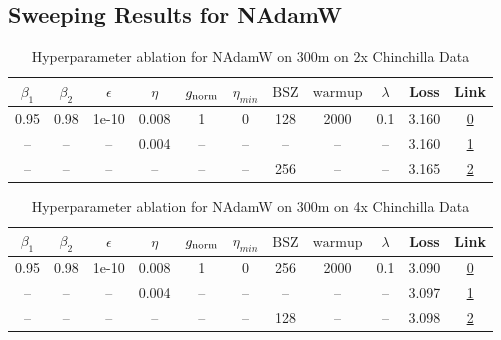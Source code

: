 \subsection{Sweeping Results for NAdamW}%
\begin{table}[H]
\centering
\caption{Hyperparameter ablation for NAdamW on 300m on 2x Chinchilla Data}
\label{tab:ablation_nadamw_300m_on_2x_chinchilla_data}
\begin{tabular}{ccccccccccc}
\toprule
$\beta_1$ & $\beta_2$ & $\epsilon$ & $\eta$ & $g_{\mathrm{norm}}$ & $\eta_{min}$ & $\mathrm{BSZ}$ & $\mathrm{warmup}$ & $\lambda$ & Loss & Link \\
\midrule
0.95 & 0.98 & 1e-10 & 0.008 & 1 & 0 & 128 & 2000 & 0.1 & 3.160 & \href{https://wandb.ai/marin-community/optimizer-scaling/runs/sweep-300m-12B-nadamwd89df2lr0.008-wd0.1-minlr0-warmup2000-b10.9-07cb43}{0} \\
\midrule
-- & -- & -- & 0.004 & -- & -- & -- & -- & -- & 3.160 & \href{https://wandb.ai/marin-community/optimizer-scaling/runs/sweep-300m-12B-nadamw59ffb0lr0.004-wd0.1-minlr0-warmup2000-b10.9-f2e4bd}{1} \\
-- & -- & -- & -- & -- & -- & 256 & -- & -- & 3.165 & \href{https://wandb.ai/marin-community/optimizer-scaling/runs/sweep-300m-12B-nadamwf15cf6lr0.008-wd0.1-minlr0-warmup2000-b10.9-3065ca}{2} \\
\bottomrule
\end{tabular}
\end{table}

\begin{table}[H]
\centering
\caption{Hyperparameter ablation for NAdamW on 300m on 4x Chinchilla Data}
\label{tab:ablation_nadamw_300m_on_4x_chinchilla_data}
\begin{tabular}{ccccccccccc}
\toprule
$\beta_1$ & $\beta_2$ & $\epsilon$ & $\eta$ & $g_{\mathrm{norm}}$ & $\eta_{min}$ & $\mathrm{BSZ}$ & $\mathrm{warmup}$ & $\lambda$ & Loss & Link \\
\midrule
0.95 & 0.98 & 1e-10 & 0.008 & 1 & 0 & 256 & 2000 & 0.1 & 3.090 & \href{https://wandb.ai/marin-community/optimizer-scaling/runs/sweep-300m-24B-nadamwd89df2lr0.008-wd0.1-minlr0-warmup2000-b10.9-c667e7}{0} \\
\midrule
-- & -- & -- & 0.004 & -- & -- & -- & -- & -- & 3.097 & \href{https://wandb.ai/marin-community/optimizer-scaling/runs/sweep-300m-24B-nadamw59ffb0lr0.004-wd0.1-minlr0-warmup2000-b10.9-53a554}{1} \\
-- & -- & -- & -- & -- & -- & 128 & -- & -- & 3.098 & \href{https://wandb.ai/marin-community/optimizer-scaling/runs/sweep-300m-24B-nadamw506173lr0.008-wd0.1-minlr0-warmup2000-b10.9-aa9d7a}{2} \\
\bottomrule
\end{tabular}
\end{table}

